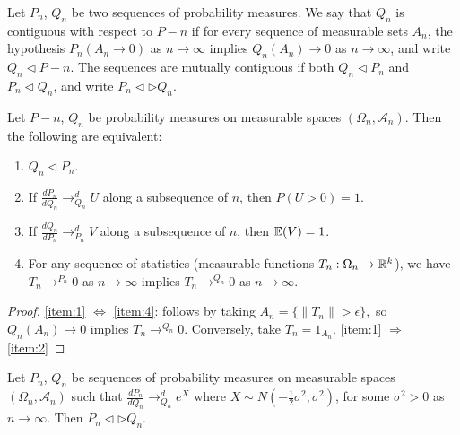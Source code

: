 \begin{defn}[Contiguity]
  \label{sec:cons-param-model}
  Let $P_{n}$, $Q_{n}$ be two sequences of probability measures. We
  say that $Q_{n}$ is contiguous with respect to $P-n$ if for every
  sequence of measurable sets $A_{n}$, the hypothesis $P_{n}(A_{n}
  \rightarrow 0)$ as $n \rightarrow \infty$ implies $Q_{n}(A_{n})
  \rightarrow 0$  as $n \rightarrow \infty$, and write $Q_{n}
  \triangleleft P-n$.  The sequences are mutually contiguous if both
  $Q_{n} \triangleleft P_{n}$ and $P_{n} \triangleleft Q_{n}$, and
  write $P_{n} \triangleleft \triangleright Q_{n}$.
\end{defn}

\begin{thm}
  Let $P-n$, $Q_{n}$ be probability measures on measurable spaces
  $(\Omega_{n}, \mathcal{A}_{n})$.  Then the following are equivalent:
  \begin{enumerate}
  \item\label{item:1} $Q_{n} \triangleleft P_{n}$.
  \item\label{item:2} If $\frac{dP_{n}}{dQ_{n}} \rightarrow^{d}_{Q_{n}} U$ along a
    subsequence of $n$, then $P(U > 0) = 1$.
  \item\label{item:3} If $\frac{dQ_{n}}{dP_{n}} \rightarrow^{d}_{P_{n}} V$ along a
    subsequence of $n$, then $\E{V} = 1$.
  \item\label{item:4} For any sequence of statistics (measurable functions $T_{n}:
    \Omega_{n} \rightarrow \mathbb{R}^{k}$), we have $T_{n}
    \rightarrow^{P_{n}} 0$ as $n \rightarrow \infty$ implies $T_{n}
    \rightarrow^{Q_{n}} 0$ as $n \rightarrow \infty$.
  \end{enumerate}
\end{thm}

\begin{proof}
  \ref{item:1} $\iff$ \ref{item:4}: follows by taking $A_{n} =
    \{ \| T_{n} \| > \epsilon \},$ so $Q_{n}(A_{n}) \rightarrow 0$
    implies $T_{n} \rightarrow^{Q_{n}} 0$.  Conversely, take $T_{n} = 1_{A_{n}}$.
  \ref{item:1} $\Rightarrow$ \ref{item:2}
\end{proof}


\begin{thm}
  Let $P_{n}$, $Q_{n}$ be sequences of probability measures on
  measurable spaces $(\Omega_{n}, \mathcal{A}_{n})$ such that
  $\frac{dP_{n}}{dQ_{n}} \rightarrow^{d}_{Q_{n}} e^{X}$ where $X \sim
  N(-\frac{1}{2} \sigma^{2}, \sigma^{2})$, for some $\sigma^{2} > 0$
  as $n \rightarrow \infty$. Then $P_{n} \triangleleft \triangleright
  Q_{n}$.
\end{thm}

